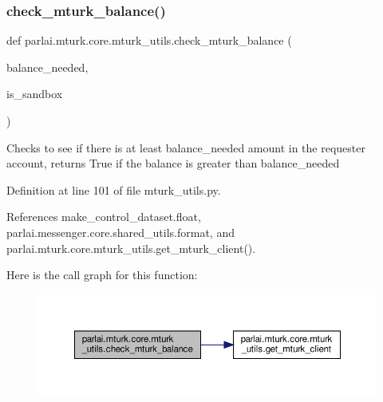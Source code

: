 \subsubsection{\texorpdfstring{check\+\_\+mturk\+\_\+balance()}{check\_mturk\_balance()}}
{\footnotesize\ttfamily def parlai.\+mturk.\+core.\+mturk\+\_\+utils.\+check\+\_\+mturk\+\_\+balance (\begin{DoxyParamCaption}\item[{}]{balance\+\_\+needed,  }\item[{}]{is\+\_\+sandbox }\end{DoxyParamCaption})}

\begin{DoxyVerb}Checks to see if there is at least balance_needed amount in the
requester account, returns True if the balance is greater than
balance_needed
\end{DoxyVerb}
 

Definition at line 101 of file mturk\+\_\+utils.\+py.



References make\+\_\+control\+\_\+dataset.\+float, parlai.\+messenger.\+core.\+shared\+\_\+utils.\+format, and parlai.\+mturk.\+core.\+mturk\+\_\+utils.\+get\+\_\+mturk\+\_\+client().

Here is the call graph for this function\+:
\nopagebreak
\begin{figure}[H]
\begin{center}
\leavevmode
\includegraphics[width=350pt]{namespaceparlai_1_1mturk_1_1core_1_1mturk__utils_a68fb1962cbfa751d20f701da94ada62b_cgraph}
\end{center}
\end{figure}
\mbox{\label{namespaceparlai_1_1mturk_1_1core_1_1mturk__utils_a3f54e0bc76066fc3a784d6b2e3fc13bb}} 
